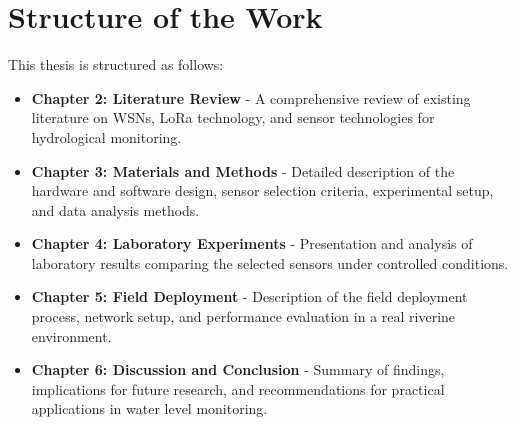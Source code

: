\section{Structure of the Work}

This thesis is structured as follows:
\begin{itemize}
    \item \textbf{Chapter 2: Literature Review} - A comprehensive review of existing literature on WSNs, LoRa technology, and sensor technologies for hydrological monitoring.
    \item \textbf{Chapter 3: Materials and Methods} - Detailed description of the hardware and software design, sensor selection criteria, experimental setup, and data analysis methods.
    \item \textbf{Chapter 4: Laboratory Experiments} - Presentation and analysis of laboratory results comparing the selected sensors under controlled conditions.
    \item \textbf{Chapter 5: Field Deployment} - Description of the field deployment process, network setup, and performance evaluation in a real riverine environment.
    \item \textbf{Chapter 6: Discussion and Conclusion} - Summary of findings, implications for future research, and recommendations for practical applications in water level monitoring.
\end{itemize}



